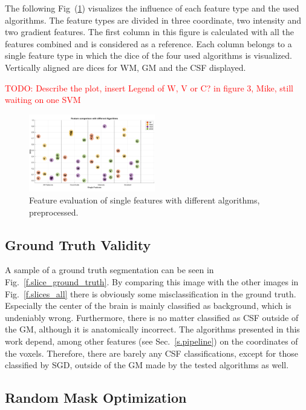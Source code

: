 \documentclass[journal]{IEEEtran}
\newcommand\TODO[1]{\textcolor{red}{TODO: #1}}
\begin{document}
The following Fig~(\ref{FeatEval}) visualizes the influence of each feature type and the used algorithms. The feature types are divided in three coordinate, two intensity and two gradient features. The first column in this figure is calculated with all the features combined and is considered as a reference. Each column belongs to a single feature type in which the dice of the four used algorithms is visualized. Vertically aligned are dices for WM, GM and the CSF displayed.

\TODO{Describe the plot, insert Legend of W, V or C? in figure 3, Mike, still waiting on one SVM}
\begin{figure}[h]
	\centering
	\includegraphics[width=0.49\textwidth]{images/FeatureEvaluation}
	\caption{Feature evaluation of single features with different algorithms, preprocessed.}
	\label{FeatEval}
\end{figure}




\subsection{Ground Truth Validity}

A sample of a ground truth segmentation can be seen in Fig.~\ref{f.slice_ground_truth}. By comparing this image with the other images in Fig.~\ref{f.slices_all} there is obviously some misclassification in the ground truth. Especially the center of the brain is mainly classified as background, which is undeniably wrong. Furthermore, there is no matter classified as CSF outside of the GM, although it is anatomically incorrect. The algorithms presented in this work depend, among other features (see Sec.~\ref{s.pipeline}) on the coordinates of the voxels. Therefore, there are barely any CSF classifications, except for those classified by SGD, outside of the GM made by the tested algorithms as well.



\subsection{Random Mask Optimization}
\end{document}
